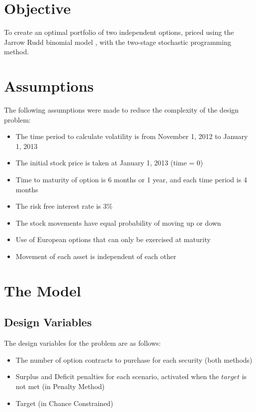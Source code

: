 \documentclass[12pt]{article}
\begin{document}
\section{Objective}
To create an optimal portfolio of two independent options, priced using the Jarrow Rudd binomial model \cite{jarrow1983option, jrudd_other, jrudd_impl}, with the two-stage stochastic programming method.

\section{Assumptions}

The following assumptions were made to reduce the complexity of the design problem:
\begin{itemize}
	\item The time period to calculate volatility is from November 1, 2012 to January 1, 2013
	\item The initial stock price is taken at January 1, 2013 (time = 0)
	\item Time to maturity of option is 6 months or 1 year, and each time period is 4 months
	\item The risk free interest rate is 3\%
	\item The stock movements have equal probability of moving up or down
	\item Use of European options that can only be exercised at maturity
	\item Movement of each asset is independent of each other
\end{itemize}


\section{The Model}
\subsection{Design Variables}
The design variables for the problem are as follows:
\begin{itemize}
	\item The number of option contracts to purchase for each security (both methods)
	\item Surplus and Deficit penalties for each scenario, activated when the $target$ is not met (in Penalty Method)
	\item Target (in Chance Constrained)
\end{itemize}
\end{document}
